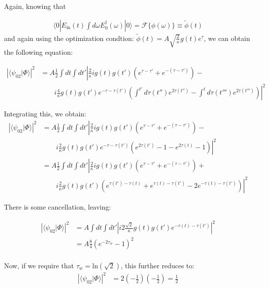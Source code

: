 \documentclass[12pt]{article}
\begin{document}
Again, knowing that


\begin{align}
\langle 0 |E_\textrm{in}(t) \int d\omega E^\dagger_0(\omega) | 0 \rangle= \mathscr{F}\{\phi(\omega)\} \equiv \tilde{\phi}(t)
\end{align}
and again using the optimization condtion: $\tilde{\phi}(t) =A \sqrt{\frac{2}{\kappa}} g(t) e^{\tau}$, we can obtain the following equation:

\begin{align}
\left | \langle \psi_{02} | \Phi \rangle \right | ^2 & =A \frac{1}{2}\int dt \int dt'\left | \frac{2}{\kappa} i g(t) g(t') \left(e^{\tau-\tau'} +e^{-(\tau-\tau')}\right) -\right.\\
&\qquad \left.i \frac{4}{\kappa}g(t) g(t') e^{-\tau-\tau(t')}\left( \int^{t'} d \tau(t'') e^{2\tau(t'')} - \int^t d \tau(t''') e^{2\tau(t''')} \right) \right |^2
\end{align}

Integrating this, we obtain:
\begin{align}
\left | \langle \psi_{02} | \Phi \rangle \right | ^2 & =A \frac{1}{2}\int dt \int dt'\left | \frac{2}{\kappa} i g(t) g(t') \left(e^{\tau-\tau'} +e^{-(\tau-\tau')}\right) -\right.\\
&\qquad \left.i \frac{2}{\kappa}g(t) g(t') e^{-\tau-\tau(t')}\left( e^{2\tau(t')}-1 - e^{2\tau(t)}-1 \right) \right |^2 \\
 &=A  \frac{1}{2}\int dt \int dt'\left | \frac{2}{\kappa} i g(t) g(t') \left(e^{\tau-\tau'} +e^{-(\tau-\tau')}\right) +\right.\\
&\qquad \left.i \frac{2}{\kappa}g(t) g(t') \left( e^{\tau(t')-\tau(t)} + e^{\tau(t)-\tau(t')}-2e^{-\tau(t)-\tau(t')} \right) \right |^2
\end{align}

There is some cancellation, leaving:

\begin{align}
\label{p02}
\left | \langle \psi_{02} | \Phi \rangle \right | ^2 & =A\int dt \int dt'\left |i 2\frac{\sqrt{2}}{\kappa} g(t)g(t') e^{-\tau(t)-\tau(t')} \right|^2 \\
&=A \frac{8}{4} \left ( e^{-2\tau_w}-1\right)^2\\
\end{align}

Now, if we require that $\tau_w = \textrm{ln}(\sqrt{2})$, this further reduces to:
\begin{align}
\left | \langle \psi_{02} | \Phi \rangle \right | ^2 &=2(-\frac{1}{2})(-\frac{1}{2})=\frac{1}{2}
\end{align}
\end{document}
